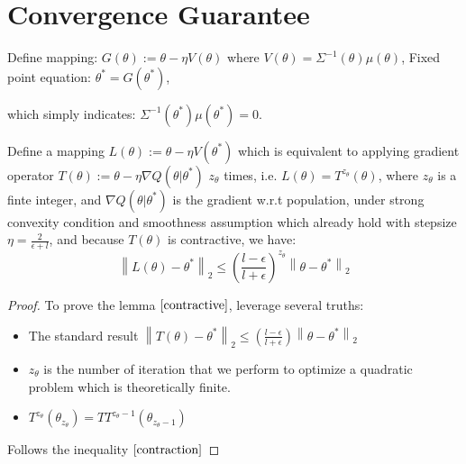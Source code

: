 \documentclass{beamer}
\begin{document}
\section{Convergence Guarantee}
\begin{frame}

  \begin{block}{}
    Define mapping: $G(\theta) := \theta - \eta V(\theta )$
where $V(\theta) = \Sigma^{-1}(\theta) \mu(\theta)$, %
Fixed point equation: $\theta^* = G(\theta^*)$,

which simply indicates: $\Sigma^{-1}(\theta^*) \mu(\theta^*) = 0$. %
  \end{block}
  \begin{lemma}
    Define a mapping $L(\theta) := \theta - \eta V(\theta^*) $ which is equivalent to applying gradient operator $T(\theta) := \theta - \eta \nabla Q(\theta|\theta^*)$ $z_{\theta}$ times, i.e. $L(\theta) = T^{z_{\theta}}(\theta)$, where $z_{\theta}$ is a finte integer, and $\nabla Q(\theta|\theta^*)$  is the gradient w.r.t population, under strong
    convexity condition and smoothness assumption which already hold with stepsize $\eta = \frac{2}{\epsilon+l}$, and because $T(\theta)$ is contractive, we have:
    \begin{equation}
      \left\lVert L(\theta) - \theta^* \right\lVert_2 \leq (\frac{l - \epsilon}{l+ \epsilon})^{z_{\theta}}\left\lVert \theta - \theta^* \right\lVert_2
    \label{contraction}
    \end{equation} 
    \label{contractive}
  \end{lemma}

\end{frame}

\begin{frame}
\begin{block}{}
  \begin{proof}
  To prove the lemma $\ref{contractive}$, leverage several truths:
  \begin{itemize}
    \item The standard result $ \left\lVert T(\theta) - \theta^* \right\lVert_2 \leq (\frac{l - \epsilon}{l+ \epsilon})\left\lVert \theta - \theta^* \right\lVert_2  $ 
    \item $z_{\theta}$ is the number of iteration that we perform to optimize a quadratic problem which is theoretically finite.
    \item $ T^{z_{\theta}}(\theta_{z_{\theta}}) = T T^{z_{\theta}-1}(\theta_{z_{\theta}-1})$
  \end{itemize}
  Follows the inequality $\ref{contraction}$
\end{proof}
\end{block}

\end{frame}
\end{document}
